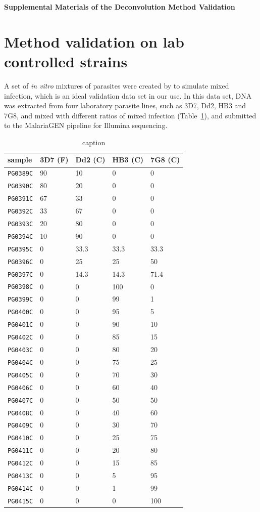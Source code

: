 

\begin{center}
\textbf{\large Supplemental Materials of the Deconvolution Method Validation}
\end{center}

\section{Method validation on lab controlled strains} \label{sup:sec:validate}
A set of {\it in vitro} mixtures of parasites were created by \citet{Wendler2015:sup} to simulate mixed infection, which is an ideal validation data set in our use. In this data set, DNA was extracted from four laboratory parasite lines, such as 3D7, Dd2, HB3 and 7G8, and mixed with different ratios of mixed infection (Table~\ref{tab:jason}), and submitted to the MalariaGEN \citep{MalariaGen2008:sup} pipeline for Illumina sequencing.

\begin{table}[ht]\centering
\begin{tabular}[c]{@{}l|llll@{}}
sample    & 3D7 (F) & Dd2 (C) & HB3 (C) & 7G8 (C)\\ \hline
{\tt PG0389\-C} & 90 & 10 & 0 & 0\tabularnewline
{\tt PG0390\-C} & 80 & 20 & 0 & 0\tabularnewline
{\tt PG0391\-C} & 67 & 33 & 0 & 0\tabularnewline
{\tt PG0392\-C} & 33 & 67 & 0 & 0\tabularnewline
{\tt PG0393\-C} & 20 & 80 & 0 & 0\tabularnewline
{\tt PG0394\-C} & 10 & 90 & 0 & 0\tabularnewline
{\tt PG0395\-C} & 0 & 33.3 & 33.3 & 33.3\tabularnewline
{\tt PG0396\-C} & 0 & 25 & 25 & 50\tabularnewline
{\tt PG0397\-C} & 0 & 14.3 & 14.3 & 71.4\tabularnewline
{\tt PG0398\-C} & 0 & 0 & 100 & 0\tabularnewline
{\tt PG0399\-C} & 0 & 0 & 99 & 1\tabularnewline
{\tt PG0400\-C} & 0 & 0 & 95 & 5\tabularnewline
{\tt PG0401\-C} & 0 & 0 & 90 & 10\tabularnewline
{\tt PG0402\-C} & 0 & 0 & 85 & 15\tabularnewline
{\tt PG0403\-C} & 0 & 0 & 80 & 20\tabularnewline
{\tt PG0404\-C} & 0 & 0 & 75 & 25\tabularnewline
{\tt PG0405\-C} & 0 & 0 & 70 & 30\tabularnewline
{\tt PG0406\-C} & 0 & 0 & 60 & 40\tabularnewline
{\tt PG0407\-C} & 0 & 0 & 50 & 50\tabularnewline
{\tt PG0408\-C} & 0 & 0 & 40 & 60\tabularnewline
{\tt PG0409\-C} & 0 & 0 & 30 & 70\tabularnewline
{\tt PG0410\-C} & 0 & 0 & 25 & 75\tabularnewline
{\tt PG0411\-C} & 0 & 0 & 20 & 80\tabularnewline
{\tt PG0412\-C} & 0 & 0 & 15 & 85\tabularnewline
{\tt PG0413\-C} & 0 & 0 & 5 & 95\tabularnewline
{\tt PG0414\-C} & 0 & 0 & 1 & 99\tabularnewline
{\tt PG0415\-C} & 0 & 0 & 0 & 100\tabularnewline
\end{tabular}
\caption{\color{red}caption}
\label{tab:jason}
\end{table}


